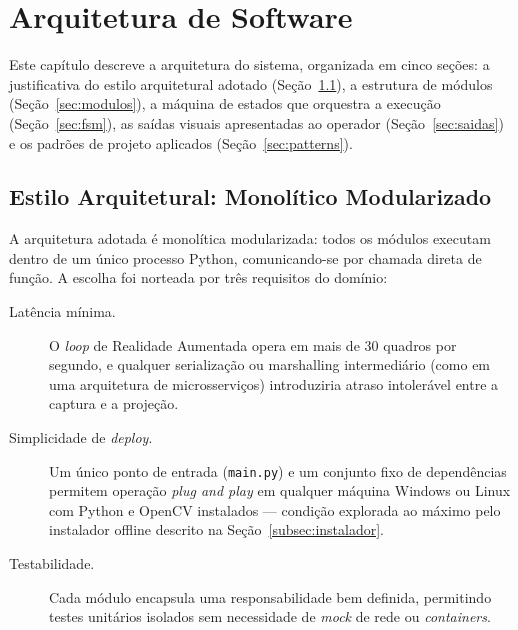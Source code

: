 
\chapter{Arquitetura de Software}
\label{cap:arquitetura}

Este capítulo descreve a arquitetura do sistema, organizada em cinco
seções: a justificativa do estilo arquitetural adotado
(Seção~\ref{sec:estilo}), a estrutura de módulos
(Seção~\ref{sec:modulos}), a máquina de estados que orquestra a execução
(Seção~\ref{sec:fsm}), as saídas visuais apresentadas ao operador
(Seção~\ref{sec:saidas}) e os padrões de projeto aplicados
(Seção~\ref{sec:patterns}).

\section{Estilo Arquitetural: Monolítico Modularizado}
\label{sec:estilo}

A arquitetura adotada é monolítica modularizada: todos os
módulos executam dentro de um único processo Python, comunicando-se por
chamada direta de função. A escolha foi norteada por três requisitos do
domínio:

\begin{description}
    \item[Latência mínima.] O \textit{loop} de Realidade Aumentada
          opera em mais de 30 quadros por segundo, e qualquer
          serialização ou marshalling intermediário (como em uma
          arquitetura de microsserviços) introduziria atraso intolerável
          entre a captura e a projeção.
    \item[Simplicidade de \textit{deploy}.] Um único ponto de entrada
          (\texttt{main.py}) e um conjunto fixo de dependências
          permitem operação \textit{plug and play} em qualquer máquina
          Windows ou Linux com Python e OpenCV instalados — condição
          explorada ao máximo pelo instalador offline descrito na
          Seção~\ref{subsec:instalador}.
    \item[Testabilidade.] Cada módulo encapsula uma responsabilidade
          bem definida, permitindo testes unitários isolados sem
          necessidade de \emph{mock} de rede ou \emph{containers}.
\end{description}

